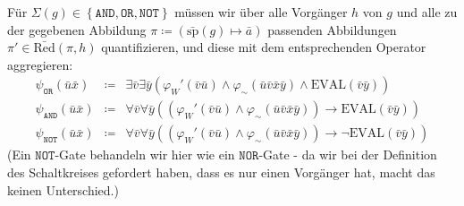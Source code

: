 Für $\Sigma\left(g\right)\in\left\{ \mathtt{AND},\mathtt{OR},\mathtt{NOT}\right\} $
müssen wir über alle Vorgänger $h$ von $g$ und alle zu der gegebenen
Abbildung $\pi\coloneqq\left(\bar{\mathrm{sp}}\left(g\right)\mapsto\bar{a}\right)$
passenden Abbildungen $\pi'\in\bar{\mathrm{Red}}\left(\pi,h\right)$
quantifizieren, und diese mit dem entsprechenden Operator aggregieren:
\begin{eqnarray*}
\psi_{\mathtt{OR}}\left(\bar{u}\bar{x}\right) & \coloneqq & \exists\bar{v}\exists\bar{y}\left(\varphi_{W}'\left(\bar{v}\bar{u}\right)\wedge\varphi_{\sim}\left(\bar{u}\bar{v}\bar{x}\bar{y}\right)\wedge\mathrm{EVAL}\left(\bar{v}\bar{y}\right)\right)\\
\psi_{\mathtt{AND}}\left(\bar{u}\bar{x}\right) & \coloneqq & \forall\bar{v}\forall\bar{y}\left(\left(\varphi_{W}'\left(\bar{v}\bar{u}\right)\wedge\varphi_{\sim}\left(\bar{u}\bar{v}\bar{x}\bar{y}\right)\right)\rightarrow\mathrm{EVAL}\left(\bar{v}\bar{y}\right)\right)\\
\psi_{\mathtt{NOT}}\left(\bar{u}\bar{x}\right) & \coloneqq & \forall\bar{v}\forall\bar{y}\left(\left(\varphi_{W}'\left(\bar{v}\bar{u}\right)\wedge\varphi_{\sim}\left(\bar{u}\bar{v}\bar{x}\bar{y}\right)\right)\rightarrow\neg\mathrm{EVAL}\left(\bar{v}\bar{y}\right)\right)
\end{eqnarray*}
(Ein $\mathtt{NOT}$-Gate behandeln wir hier wie ein $\mathtt{NOR}$-Gate
- da wir bei der Definition des Schaltkreises gefordert haben, dass
es nur einen Vorgänger hat, macht das keinen Unterschied.)


